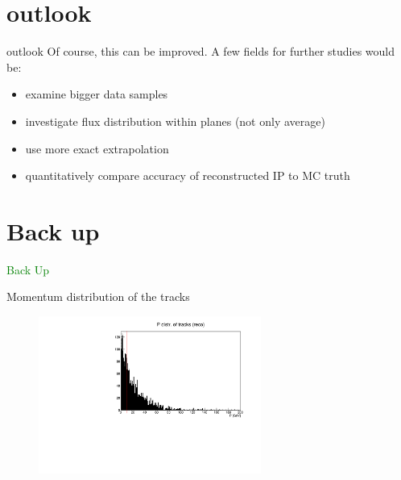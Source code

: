 \section{outlook}

\begin{frame}[t]{outlook}
  \vspace*{\fill}
    Of course, this can be improved. A few fields for further studies would be:
    \begin{itemize}
      \item examine bigger data samples
      \item investigate flux distribution within planes (not only average)
      \item use more exact extrapolation
      \item quantitatively compare accuracy of reconstructed IP to MC truth
    \end{itemize}
  \vspace*{\fill}
\end{frame}

\section{Back up}
\appendix

\begin{frame}

\end{frame}

\begin{frame}[t]{}
  \centering
  \textcolor{green}{\Huge{Back Up}}
\end{frame}



\begin{frame}[t]{Momentum distribution of the tracks}
  \begin{figure}
    \centering
    \includegraphics[width=0.65\textwidth]{../hists/nofield/mom_reco_tracks.pdf}
  \end{figure}
\end{frame}

